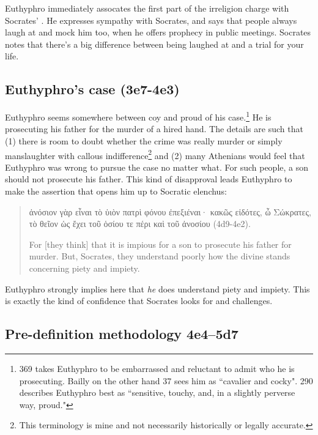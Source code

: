 \documentclass[11pt]{article}
\begin{document}
Euthyphro immediately assocates the first part of the irreligion charge with Socrates' .  He expresses sympathy with Socrates, and says that people always laugh at and mock him too, when he offers prophecy in public meetings.  Socrates notes that there's a big difference between being laughed at and a trial for your life.

\subsection{Euthyphro's case (3e7-4e3)}

Euthyphro seems somewhere between coy and proud of his case.\footnote{\citet{geach1966} 369 takes Euthyphro to be embarrassed and reluctant to admit who he is prosecuting.  Bailly on the other hand \citeyearpar{bailly2003} 37 sees him as ``cavalier and cocky".  \citet{nehamas1975} 290 describes Euthyphro best as ``sensitive, touchy, and, in a slightly perverse way, proud."}  He is prosecuting his father for the murder of a hired hand.  The details are such that (1) there is room to doubt whether the crime was really murder or simply manslaughter with callous indifference\footnote{This terminology is mine and not necessarily historically or legally accurate.} and (2) many Athenians would feel that Euthyphro was wrong to pursue the case no matter what.  For such people, a son should not prosecute his father.  This kind of disapproval leads Euthyphro to make the assertion that opens him up to Socratic elenchus:

\begin{quote}
    ἀνόσιον γὰρ εἶναι τὸ ὑιὸν πατρὶ φόνου ἐπεξιέναι· κακῶς εἰδότες, ὦ Σώκρατες, τὸ θεῖον ὡς ἔχει τοῦ ὁσίου τε πέρι καὶ τοῦ ἀνοσίου (4d9-4e2).

    For [they think] that it is impious for a son to prosecute his father for murder.  But, Socrates, they understand poorly how the divine stands concerning piety and impiety.
\end{quote}

Euthyphro strongly implies here that \emph{he} does understand piety and impiety. This is exactly the kind of confidence that Socrates looks for and challenges.

\subsection{Pre-definition methodology 4e4--5d7}
\end{document}

